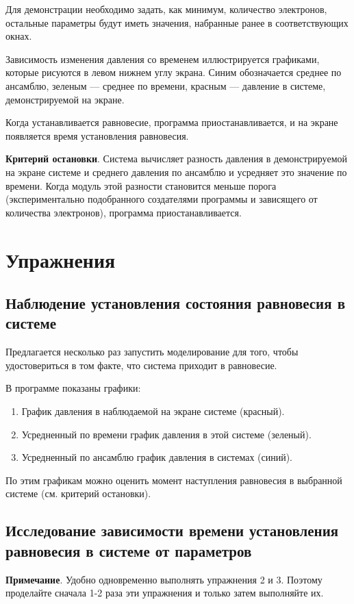 \documentclass[12pt,a4paper]{scrartcl}
\begin{document}
	Для демонстрации необходимо задать, как минимум, количество электронов, остальные параметры будут иметь значения, набранные ранее в соответствующих окнах.
    
	Зависимость изменения давления со временем иллюстрируется графиками, которые рисуются в левом нижнем углу экрана. Синим обозначается среднее по ансамблю, зеленым --- среднее по времени, красным --- давление в системе, демонстрируемой на экране.
	
	Когда устанавливается равновесие, программа приостанавливается, и на экране появляется время установления равновесия.
	
	{\bf Критерий остановки}. Система вычисляет разность давления в демонстрируемой на экране системе и среднего давления по ансамблю и усредняет это значение по времени. Когда модуль этой разности становится меньше порога (экспериментально подобранного создателями программы и зависящего от количества электронов), программа приостанавливается.

\section{Упражнения}
\subsection{Наблюдение установления состояния равновесия в системе}
	Предлагается несколько раз запустить моделирование для того, чтобы удостовериться в том факте, что система приходит в равновесие.
	
	В программе показаны графики:
	\begin{enumerate}
	\item График давления в наблюдаемой на экране системе (красный).
	\item Усредненный по времени график давления в этой системе (зеленый).
	\item Усредненный по ансамблю график давления в системах (синий).
	\end{enumerate}
	
	По этим графикам можно оценить момент наступления равновесия в выбранной системе (см. критерий остановки).
\subsection{Исследование зависимости времени установления равновесия в системе от параметров}
	{\bf Примечание}. Удобно одновременно выполнять упражнения 2 и 3. Поэтому проделайте сначала 1-2 раза эти упражнения и только затем выполняйте их.
	
\end{document}
